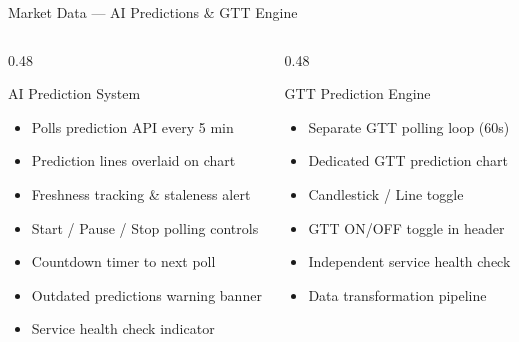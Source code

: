 \documentclass[aspectratio=169, 11pt]{beamer}
\begin{document}
\begin{frame}{Market Data — AI Predictions \& GTT Engine}
\begin{columns}[T]
\begin{column}{0.48\textwidth}
\begin{block}{AI Prediction System}
\begin{itemize}
  \item Polls prediction API every 5 min
  \item Prediction lines overlaid on chart
  \item Freshness tracking \& staleness alert
  \item Start / Pause / Stop polling controls
  \item Countdown timer to next poll
  \item Outdated predictions warning banner
  \item Service health check indicator
\end{itemize}
\end{block}
\end{column}
\begin{column}{0.48\textwidth}
\begin{block}{GTT Prediction Engine}
\begin{itemize}
  \item Separate GTT polling loop (60s)
  \item Dedicated GTT prediction chart
  \item Candlestick / Line toggle
  \item GTT ON/OFF toggle in header
  \item Independent service health check
  \item Data transformation pipeline
\end{itemize}
\end{block}
\end{column}
\end{columns}
\end{frame}
\end{document}
